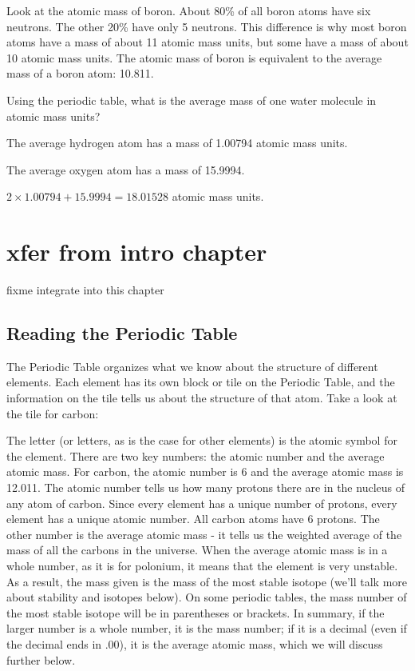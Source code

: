 Look at the atomic mass of boron. About 80\% of all boron atoms have
six neutrons. The other 20\% have only 5 neutrons. This difference is why most boron atoms
have a mass of about 11 atomic mass units, but some have a mass of
about 10 atomic mass units. The atomic mass of boron is equivalent to the average
mass of a boron atom: 10.811.

\begin{Exercise}[title={Mass of a Water Molecule}, label=water_mass]

Using the periodic table, what is the average mass of one water molecule in atomic mass units?

\end{Exercise}
\begin{Answer}[ref=water_mass]

  The average hydrogen atom has a mass of 1.00794 atomic mass units.

  The average oxygen atom has a mass of 15.9994.

  $2 \times 1.00794 + 15.9994 = 18.01528$ atomic mass units.

\end{Answer}

\section{xfer from intro chapter} 
fixme integrate into this chapter
\subsection{Reading the Periodic Table}
The Periodic Table organizes what we know about the structure of different
elements. Each element has its own block or tile on the Periodic Table, and the
information on the tile tells us about the structure of that atom. Take a look at
the tile for carbon:

\begin{center}
\end{center}

The letter (or letters, as is the case for other elements) is the atomic symbol
for the element. There are two key numbers: the atomic number and the average
atomic mass. For carbon, the atomic number is 6 and the average atomic mass is
12.011. The atomic number tells us how many protons there are in the nucleus of
any atom of carbon. Since every element has a unique number of protons, every
element has a unique atomic number. All carbon atoms have 6 protons. The other
number is the average atomic mass - it tells us the weighted average of the
mass of all the carbons in the universe. When the average atomic mass is in
a whole number, as it is for polonium, it means that the element is very unstable.
As a result, the mass given is the mass of the most stable isotope (we'll talk
more about stability and isotopes below). On some periodic tables, the mass
number of the most stable isotope will be in parentheses or brackets. In
summary, if the larger number is a whole number, it is the mass number; if it
is a decimal (even if the decimal ends in .00), it is the average atomic mass,
which we will discuss further below.

